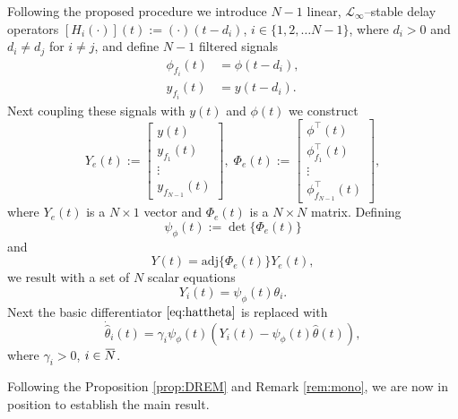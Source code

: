 \documentclass[journal, onecolumn]{IEEEtran}
\newcommand{\overbar}[1]{\mkern 1.5mu\overline{\mkern-1.5mu#1\mkern-1.5mu}\mkern 1.5mu}
\newcommand{\iinb}{i\in\overbar{N}}
\newcommand{\hth}{\hat{\theta}}
\begin{document}
Following the proposed procedure we introduce $N-1$ linear, $\mathcal{L}_\infty$--stable delay operators $[H_i(\cdot)](t):=(\cdot)(t-d_i)$,  $i\in \{1, 2, \ldots N-1\}$, where $d_i>0$ and $d_i \ne d_j$ for $i\ne j$, and define $N-1$ filtered signals
\begin{equation} \label{eq:filtphiy}
	\begin{aligned}
		\phi_{f_i}(t) &= \phi(t-d_i), \\
		y_{f_i}(t) &= y(t-d_i).
	\end{aligned}
\end{equation}
Next coupling these signals with $y(t)$ and $\phi(t)$ we construct
\begin{equation} \label{eq:YePhie}
	Y_e(t):=	\begin{bmatrix} y(t) \\ y_{f_1}(t) \\ \vdots \\ y_{f_{N-1}}(t) \end{bmatrix},
\;
	\Phi_e(t):=\begin{bmatrix} \phi^\top(t) \\ \phi^\top_{f_1}(t) \\ \vdots \\ \phi^\top_{f_{N-1}}(t) \end{bmatrix},
\end{equation}	
where $Y_e(t)$ is a $N\times 1$ vector and $\Phi_e(t)$ is a $N \times N$ matrix. Defining 
\begin{equation} \label{eq:psiphi}
	\psi_\phi(t) := \det\{\Phi_e(t)\}
\end{equation}
and
\begin{equation} \label{eq:Yphi}
	Y(t)=\mathrm{adj}\{\Phi_e(t)\} Y_e(t),
\end{equation}
we result with a set of $N$ scalar equations
\[
	Y_i(t) = \psi_\phi(t) \theta_i.
\]
Next the basic differentiator $\eqref{eq:hattheta}$ is replaced with
\begin{equation} \label{eq:estimdrem}
	\dot{\hth}_i(t) = \gamma_i \psi_\phi(t)(Y_i(t)-\psi_\phi(t)\hth(t)),
\end{equation}
where $\gamma_i>0$, $\iinb$.

Following the Proposition \ref{prop:DREM} and Remark \ref{rem:mono}, we are now in position to establish the main result.
\end{document}
